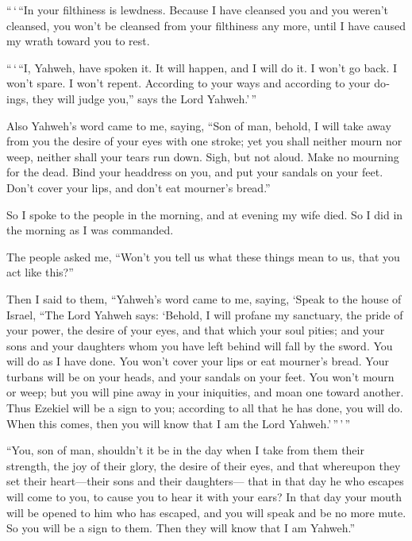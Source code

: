 \begin{paracol}{2}
\begin{otherlanguage}{english}
 ``\,`\,``In your filthiness is lewdness. Because I have
cleansed you and you weren't cleansed, you won't be cleansed from your
filthiness any more, until I have caused my wrath toward you to rest.

 ``\,`\,``I, Yahweh, have spoken it. It will happen, and
I will do it. I won't go back. I won't spare. I won't repent. According
to your ways and according to your doings, they will judge you,'' says
the Lord Yahweh.'\,''

 Also Yahweh's word came to me, saying, 
``Son of man, behold, I will take away from you the desire of your eyes
with one stroke; yet you shall neither mourn nor weep, neither shall
your tears run down.  Sigh, but not aloud. Make no
mourning for the dead. Bind your headdress on you, and put your sandals
on your feet. Don't cover your lips, and don't eat mourner's bread.''

 So I spoke to the people in the morning, and at evening
my wife died. So I did in the morning as I was commanded.

 The people asked me, ``Won't you tell us what these
things mean to us, that you act like this?''

 Then I said to them, ``Yahweh's word came to me, saying,
 `Speak to the house of Israel, ``The Lord Yahweh says:
`Behold, I will profane my sanctuary, the pride of your power, the
desire of your eyes, and that which your soul pities; and your sons and
your daughters whom you have left behind will fall by the sword.
 You will do as I have done. You won't cover your lips or
eat mourner's bread.  Your turbans will be on your heads,
and your sandals on your feet. You won't mourn or weep; but you will
pine away in your iniquities, and moan one toward another.
 Thus Ezekiel will be a sign to you; according to all
that he has done, you will do. When this comes, then you will know that
I am the Lord Yahweh.'\,''\,'\,''

 ``You, son of man, shouldn't it be in the day when I
take from them their strength, the joy of their glory, the desire of
their eyes, and that whereupon they set their heart---their sons and
their daughters---  that in that day he who escapes will
come to you, to cause you to hear it with your ears?  In
that day your mouth will be opened to him who has escaped, and you will
speak and be no more mute. So you will be a sign to them. Then they will
know that I am Yahweh.''


\end{otherlanguage}
\end{paracol}

